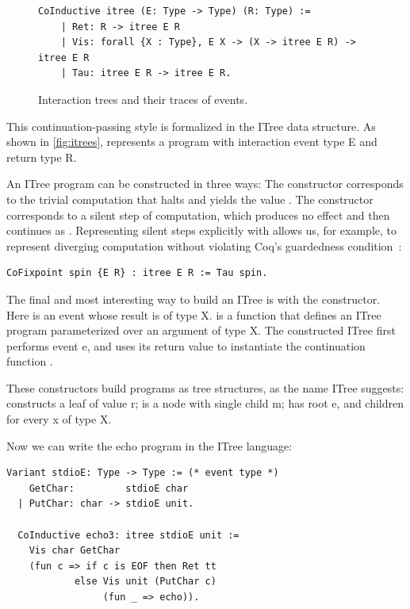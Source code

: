\begin{figure}
  \begin{lstlisting}[style=customcoq]
    CoInductive itree (E: Type -> Type) (R: Type) :=
    | Ret: R -> itree E R
    | Vis: forall {X : Type}, E X -> (X -> itree E R) -> itree E R
    | Tau: itree E R -> itree E R.
  \end{lstlisting}
  \caption{Interaction trees and their traces of events.}
  \label{fig:itrees}
\end{figure}

This continuation-passing style is formalized in the ITree data structure.  As
shown in \autoref{fig:itrees},  represents a program with
interaction event type \ilc E and return type \ilc R.

An ITree program can be constructed in three ways: The  constructor
corresponds to the trivial computation that halts and yields the value .
The  constructor corresponds to a silent step of computation, which
produces no effect and then continues as .  Representing silent steps
explicitly with  allows us, for example, to represent diverging
computation without violating Coq's guardedness condition~\cite{coinduction}:
\begin{lstlisting}[style=customcoq]
CoFixpoint spin {E R} : itree E R := Tau spin.
\end{lstlisting}

The final and most interesting way to build an ITree is with the  constructor.  Here  is an event whose result is of type \ilc
X.   is a function that defines an ITree program parameterized over an
argument of type \ilc X.  The constructed ITree first performs event \ilc e, and
uses its return value  to instantiate the continuation function
.

These constructors build programs as tree structures, as the name ITree
suggests:  constructs a leaf of value \ilc r;  is a
node with single child \ilc m;  has root \ilc e, and children
 for every \ilc x of type \ilc X.

Now we can write the echo program in the ITree language:
\begin{lstlisting}[style=customcoq]
  Variant stdioE: Type -> Type := (* event type *)
    GetChar:         stdioE char
  | PutChar: char -> stdioE unit.

  CoInductive echo3: itree stdioE unit :=
    Vis char GetChar
    (fun c => if c is EOF then Ret tt
            else Vis unit (PutChar c)
                 (fun _ => echo)).
\end{lstlisting}

